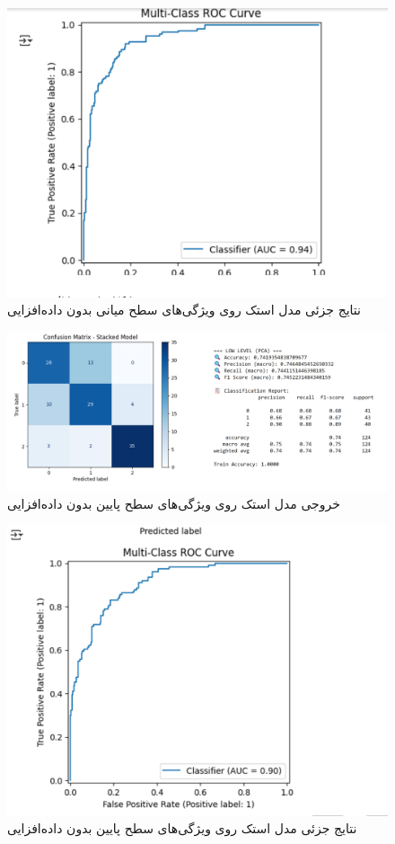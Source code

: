 \documentclass[a4paper,12pt]{article}
\begin{document}
\begin{figure}[H]
	\centering
	\includegraphics[width=1\textwidth]{1-mid-2.png}
	\caption*{نتایج جزئی مدل استک روی ویژگی‌های سطح میانی بدون داده‌افزایی}
\end{figure}
\begin{figure}[H]
	\centering
	\includegraphics[width=1\textwidth]{1-low.png}
	\caption*{خروجی مدل استک روی ویژگی‌های سطح پایین بدون داده‌افزایی}
\end{figure}
\begin{figure}[H]
	\centering
	\includegraphics[width=1\textwidth]{1-low-2.png}
	\caption*{نتایج جزئی مدل استک روی ویژگی‌های سطح پایین بدون داده‌افزایی}
\end{figure}
\end{document}
